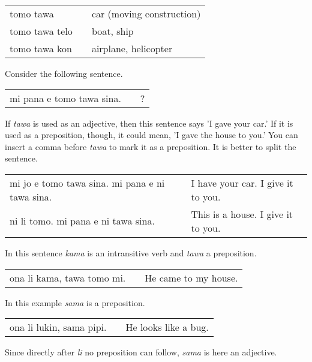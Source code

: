 \begin{supertabular}{p{5,5cm}|ll}
tomo tawa && car (moving construction) \\
tomo tawa telo && boat, ship \\
tomo tawa kon && airplane, helicopter \\
\end{supertabular} 
%

Consider the following sentence.

\begin{supertabular}{p{5,5cm}|ll}
mi pana e tomo tawa sina. && ? \\   %
\end{supertabular} 

If \textit{tawa} is used as an adjective, then this sentence says 'I gave your car.' 
If it is used as a preposition, though, it could mean, 'I gave the house to you.' 
You can insert a comma before \textit{tawa} to mark it as a preposition. 
It is better to split the sentence. 

\begin{supertabular}{p{5,5cm}|ll}
mi jo e tomo tawa sina. mi pana e ni tawa sina. && I have your car. I give it to you. \\
ni li tomo. mi pana e ni tawa sina. && This is a house. I give it to you. \\
\end{supertabular} 

%
%
In this sentence \textit{kama} is an intransitive verb and \textit{tawa} a preposition.

\begin{supertabular}{p{5,5cm}|ll}
ona li kama, tawa tomo mi. && He came to my house. \\
\end{supertabular} 

%
%

In this example \textit{sama} is a preposition.

\begin{supertabular}{p{5,5cm}|ll}
ona li lukin, sama pipi. && He looks like a bug. \\
\end{supertabular} 

Since directly after \textit{li} no preposition can follow, \textit{sama} is here an adjective. 

